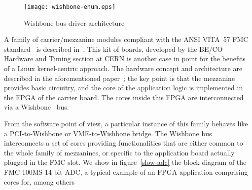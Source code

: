 \documentclass{JAC2003}
\begin{document}
\begin{figure}[t]
   \centering
   \texttt{[image: wishbone-enum.eps]}
   \caption{Wishbone bus driver architecture}
   \label{wishbone-enum}
\end{figure}

A family of carrier/mezzanine modules compliant with the ANSI VITA~57
FMC standard~\cite{vita-fmc} is described in~\cite{fpga-fmc}. This kit
of boards, developed by the BE/CO Hardware and Timing section at CERN is
another case in point for the benefits of a Linux kernel-centric
approach. The hardware concept
and architecture are described in the aforementioned paper~\cite{fpga-fmc}; the
key point is that the mezzanine provides basic circuitry, and the core of the
application logic is implemented in the FPGA of the carrier board. The cores
inside this FPGA are interconnected via a Wishbone~\cite{wishbone-spec} bus.


From the software point of view, a particular instance of this family
behaves like a PCI-to-Wishbone or VME-to-Wishbone bridge. The Wishbone
bus interconnects a set of cores providing functionalities that are either
common to the whole family of mezzanines, or specific to the application
board actually plugged in the FMC slot. We show in figure~\ref{slow-adc}
the block diagram of the FMC 100MS 14 bit ADC, a typical example of an FPGA
application comprising cores for, among others
\end{document}

